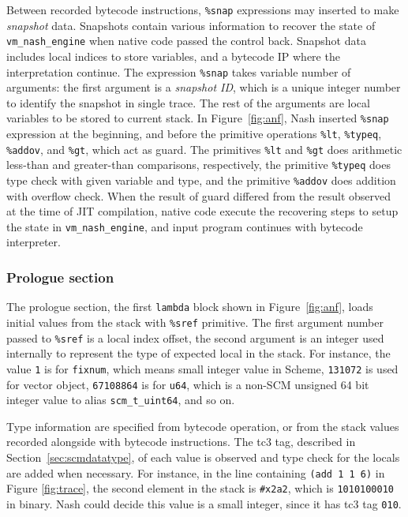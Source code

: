 \documentclass[preprint, 10pt]{sigplanconf}
\begin{document}
Between recorded bytecode instructions, \texttt{\%snap} expressions may
inserted to make \textit{snapshot} data. Snapshots contain various information
to recover the state of \texttt{vm\_nash\_engine} when native code passed the
control back. Snapshot data includes local indices to store variables, and a
bytecode IP where the interpretation continue. The expression \texttt{\%snap}
takes variable number of arguments: the first argument is a \textit{snapshot
  ID}, which is a unique integer number to identify the snapshot in single
trace. The rest of the arguments are local variables to be stored to current
stack. In Figure~\hyperref[fig:anf]{\ref{fig:anf}}, Nash inserted
\texttt{\%snap} expression at the beginning, and before the primitive
operations \texttt{\%lt}, \texttt{\%typeq}, \texttt{\%addov}, and
\texttt{\%gt}, which act as guard. The primitives \texttt{\%lt} and
\texttt{\%gt} does arithmetic less-than and greater-than comparisons,
respectively, the primitive \texttt{\%typeq} does type check with given
variable and type, and the primitive \texttt{\%addov} does addition with
overflow check. When the result of guard differed from the result observed at
the time of JIT compilation, native code execute the recovering steps to setup
the state in \texttt{vm\_nash\_engine}, and input program continues with
bytecode interpreter.

\subsubsection{Prologue section}
\label{sec:irprologue}

The prologue section, the first \texttt{lambda} block shown in
Figure~\hyperref[fig:anf]{\ref{fig:anf}}, loads initial values from the stack
with \texttt{\%sref} primitive. The first argument number passed to
\texttt{\%sref} is a local index offset, the second argument is an integer
used internally to represent the type of expected local in the stack. For
instance, the value \texttt{1} is for \texttt{fixnum}, which means small
integer value in Scheme, \texttt{131072} is used for vector object,
\texttt{67108864} is for \texttt{u64}, which is a non-SCM unsigned 64 bit
integer value to alias \texttt{scm\_t\_uint64}, and so on.

Type information are specified from bytecode operation, or from the stack
values recorded alongside with bytecode instructions. The tc3 tag, described
in Section~\ref{sec:scmdatatype}, of each value is observed and type check for
the locals are added when necessary. For instance, in the line containing
\texttt{(add~1~1~6)} in Figure \hyperref[fig:trace]{\ref{fig:trace}}, the
second element in the stack is \texttt{\#x2a2}, which is \texttt{1010100010}
in binary. Nash could decide this value is a small integer, since it has tc3
tag \texttt{010}.
\end{document}
